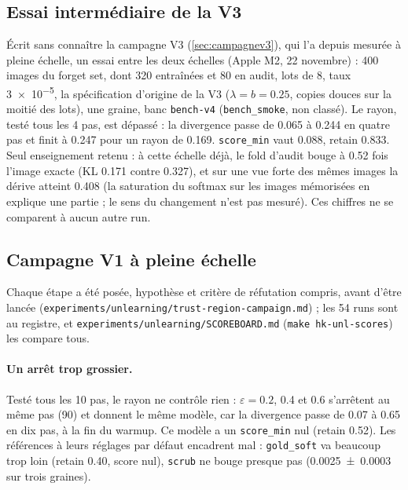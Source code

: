 \documentclass[11pt,a4paper]{article}
\newcommand{\code}[1]{\texttt{#1}}
\newcommand{\chemin}[1]{\nolinkurl{#1}}%
\begin{document}
\subsection{Essai intermédiaire de la V3}\label{sec:intermediaire}
Écrit sans connaître la campagne V3 (\cref{sec:campagnev3}), qui l'a depuis mesurée à pleine
échelle, un essai entre les deux échelles (Apple M2, 22 novembre) : 400 images du forget set, dont
320 entraînées et 80 en audit, lots de 8, taux \num{3e-5}, la spécification d'origine de la V3
($\lambda=b=\num{0.25}$, copies douces sur la moitié des lots), une graine, banc \code{bench-v4}
(\code{bench\_smoke}, non classé). Le rayon, testé tous les 4 pas, est dépassé : la divergence passe
de \num{0.065} à \num{0.244} en quatre pas et finit à \num{0.247} pour un rayon de \num{0.169}.
\code{score\_min} vaut \num{0.088}, retain \num{0.833}. Seul enseignement retenu : à cette échelle
déjà, le fold d'audit bouge à \num{0.52} fois l'image exacte (KL \num{0.171} contre \num{0.327}), et
sur une vue forte des mêmes images la dérive atteint \num{0.408} (la saturation du softmax sur les
images mémorisées en explique une partie ; le sens du changement n'est pas mesuré). Ces chiffres
ne se comparent à aucun autre run.

\subsection{Campagne V1 à pleine échelle}\label{sec:pleine}\label{sec:campagne}
Chaque étape a été posée, hypothèse et critère de réfutation compris, avant d'être lancée
(\chemin{experiments/unlearning/trust-region-campaign.md}) ; les 54 runs sont au registre, et
\chemin{experiments/unlearning/SCOREBOARD.md} (\code{make hk-unl-scores}) les compare tous.

\paragraph{Un arrêt trop grossier.} Testé tous les 10 pas, le rayon ne contrôle rien :
$\varepsilon=\num{0.2}$, \num{0.4} et \num{0.6} s'arrêtent au même pas (90) et donnent le même
modèle, car la divergence passe de \num{0.07} à \num{0.65} en dix pas, à la fin du warmup. Ce
modèle a un \code{score\_min} nul (retain \num{0.52}). Les références à leurs réglages par défaut
encadrent mal : \code{gold\_soft} va beaucoup trop loin (retain \num{0.40}, score nul),
\code{scrub} ne bouge presque pas (\num{0.0025 +- 0.0003} sur trois graines).
\end{document}
